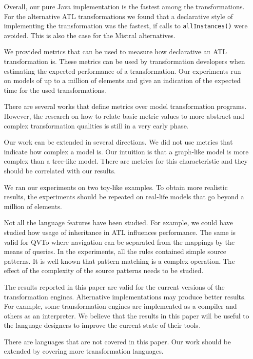 \documentclass[12pt]{elsarticle}
\begin{document}
Overall, our pure Java implementation is the fastest among the transformations.
For the alternative ATL transformations we found that a declarative style
of implementing the transformation was the fastest, if calls to \texttt{allInstances()}
were avoided. This is also the case for the Mistral alternatives.

We provided metrics that can be used to measure how declarative an ATL
transformation is. These metrics can be used by transformation developers when
estimating the expected performance of a transformation. Our experiments run on
models of up to a million of elements and give an indication of the expected
time for the used transformations.

There are several works that define metrics over model transformation programs.
However, the research on how to relate basic metric values to more abstract and
complex transformation qualities is still in a very early phase.

Our work can be extended in several directions. We did not use metrics that
indicate how complex a model is. Our intuition is that a graph-like model is
more complex than a tree-like model. There are metrics for this characteristic
and they should be correlated with our results.

We ran our experiments on two toy-like examples. To obtain more realistic
results, the experiments should be repeated on real-life models that go beyond a
million of elements.

Not all the language features have been studied. For example, we could have
studied how usage of inheritance in ATL influences performance. The same is
valid for QVTo where navigation can be separated from the mappings by the means
of queries. In the experiments, all the rules contained simple source patterns.
It is well known that pattern matching is a complex operation. The effect of the
complexity of the source patterns needs to be studied.

The results reported in this paper are valid for the current versions of the
transformation engines. Alternative implementations may produce better results.
For example, some transformation engines are implemented as a compiler and
others as an interpreter. We believe that the results in this paper will be
useful to the language designers to improve the current state of their tools.

There are languages that are not covered in this paper. Our work should be
extended by covering more transformation languages.



\end{document}

